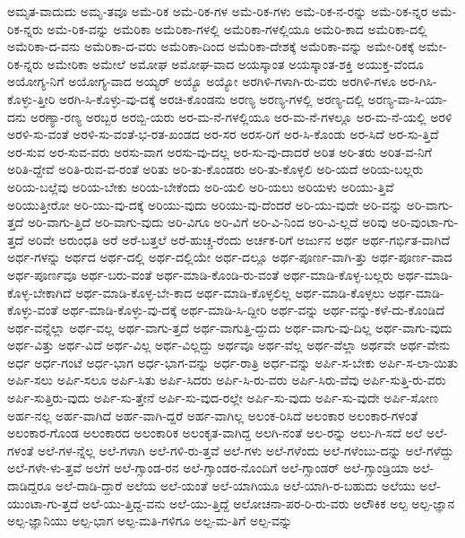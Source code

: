 {ಅಮೃತ-ವಾದುದು
ಅಮೃ-ತವೂ
ಅಮೆ-ರಿಕ
ಅಮೆ-ರಿಕ-ಗಳ
ಅಮೆ-ರಿಕ-ಗಳು
ಅಮೆ-ರಿಕ-ನ-ರನ್ನು
ಅಮೆ-ರಿಕ-ನ್ನರ
ಅಮೆ-ರಿಕ-ನ್ನರು
ಅಮೆ-ರಿಕ-ವನ್ನು
ಅಮೆರಿಕಾ
ಅಮೆರಿಕಾ-ಗಳಲ್ಲಿ
ಅಮೆರಿಕಾ-ಗಳಲ್ಲಿಯೂ
ಅಮೆರಿ-ಕಾದ
ಅಮೆರಿಕಾ-ದಲ್ಲಿ
ಅಮೆರಿಕಾ-ದ-ವನು
ಅಮೆರಿಕಾ-ದ-ವರು
ಅಮೆರಿಕಾ-ದಿಂದ
ಅಮೆರಿಕಾ-ದೇಶಕ್ಕೆ
ಅಮೆರಿಕಾ-ವನ್ನು
ಅಮೇ-ರಿಕಕ್ಕೆ
ಅಮೇ-ರಿಕ-ನ್ನರು
ಅಮೇರಿಕಾ
ಅಮೇಲೆ
ಅಮೋಘ
ಅಮೋಘ-ವಾದ
ಅಯಸ್ಕಾಂತ
ಅಯಸ್ಕಾಂತ-ಶಕ್ತಿ
ಅಯುಕ್ತ-ವೆಂದೂ
ಅಯೋಗ್ಯ-ನಿಗೆ
ಅಯೋಗ್ಯ-ವಾದ
ಅಯ್ಯರ್
ಅಯ್ಯೊ
ಅಯ್ಯೋ
ಅರಗಿಳಿ-ಗಳಾಗಿ-ರು-ವರು
ಅರಗಿಳಿ-ಗಳೂ
ಅರ-ಗಿಸಿ-ಕೊಳ್ಳು-ತ್ತೀರಿ
ಅರಗಿ-ಸಿ-ಕೊಳ್ಳು-ವು-ದಕ್ಕೆ
ಅರಚಿ-ಕೊಂಡನು
ಅರಣ್ಯ
ಅರಣ್ಯ-ಗಳಲ್ಲಿ
ಅರಣ್ಯ-ದಲ್ಲಿ
ಅರಣ್ಯ-ವಾ-ಸಿ-ಯಾ-ದನು
ಅರಣ್ಯಾ-ರಣ್ಯ
ಅರಬ್ಬರ
ಅರಬ್ಬಿ-ಯರು
ಅರ-ಮ-ನೆ-ಗಳಲ್ಲಿಯೂ
ಅರ-ಮ-ನೆ-ಗಳಲ್ಲೂ
ಅರ-ಮ-ನೆ-ಯಲ್ಲಿ
ಅರಳಿ
ಅರಳಿ-ಸು-ವಂತೆ
ಅರಳಿ-ಸು-ವಂತೆ-ಭ-ರತ-ಖಂಡದ
ಅರ-ಸರ
ಅರಸ-ರಿಗೆ
ಅರ-ಸಿ-ಕೊಂಡು
ಅರ-ಸಿದೆ
ಅರ-ಸು-ತ್ತಿದೆ
ಅರ-ಸುವ
ಅರ-ಸುವ-ವರು
ಅರಸು-ವಾಗ
ಅರಸು-ವು-ದಲ್ಲ
ಅರ-ಸು-ವು-ದಾದರೆ
ಅರಿತ
ಅರಿ-ತರು
ಅರಿತ-ವ-ನಿಗೆ
ಅರಿತಿ-ದ್ದೇವೆ
ಅರಿತಿ-ರುವ-ವ-ರಂತೆ
ಅರಿತು
ಅರಿ-ತು-ಕೊಂಡರು
ಅರಿ-ತು-ಕೊಳ್ಳಲಿ
ಅರಿ-ಯದೆ
ಅರಿಯ-ಬಲ್ಲರು
ಅರಿಯ-ಬಲ್ಲೆವು
ಅರಿಯ-ಬೇಕು
ಅರಿಯ-ಬೇಕೆಂದು
ಅರಿ-ಯಲಿ
ಅರಿ-ಯಲು
ಅರಿಯಳು
ಅರಿಯು-ತ್ತಿವೆ
ಅರಿಯುತ್ತೀರೋ
ಅರಿ-ಯು-ವು-ದಕ್ಕೆ
ಅರಿಯು-ವುದು
ಅರಿಯು-ವು-ದೆಂದರೆ
ಅರಿ-ಯು-ವುದೇ
ಅರಿ-ವನ್ನು
ಅರಿ-ವಾಗು-ತ್ತದೆ
ಅರಿ-ವಾಗು-ತ್ತಿದೆ
ಅರಿ-ವಾಗು-ವುದು
ಅರಿ-ವಿಗೂ
ಅರಿ-ವಿಗೆ
ಅರಿ-ವಿ-ನಿಂದ
ಅರಿ-ವಿ-ಲ್ಲದೆ
ಅರಿವು
ಅರಿ-ವುಂಟಾ-ಗು-ತ್ತದೆ
ಅರಿವೇ
ಅರುಂಧತಿ
ಅರೆ
ಅರೆ-ಬತ್ತಲೆ
ಅರೆ-ಹುಚ್ಚ-ರೆಂದು
ಅರ್ಚಕ-ರಿಗೆ
ಅರ್ಜುನ
ಅರ್ಥ
ಅರ್ಥ-ಗರ್ಭಿತ-ವಾಗಿದೆ
ಅರ್ಥ-ಗಳನ್ನು
ಅರ್ಥದ
ಅರ್ಥ-ದಲ್ಲಿ
ಅರ್ಥ-ದಲ್ಲಿಯೇ
ಅರ್ಥ-ದಲ್ಲೂ
ಅರ್ಥ-ಪೂರ್ಣ-ವಾಗಿ-ತ್ತು
ಅರ್ಥ-ಪೂರ್ಣ-ವಾದ
ಅರ್ಥ-ಪೂರ್ಣವೂ
ಅರ್ಥ-ಬರು-ವಂತೆ
ಅರ್ಥ-ಮಾಡಿ-ಕೊಂಡಿ-ರು-ವಂತೆ
ಅರ್ಥ-ಮಾಡಿ-ಕೊಳ್ಳ-ಬಲ್ಲರು
ಅರ್ಥ-ಮಾಡಿ-ಕೊಳ್ಳ-ಬೇಕಾಗಿದೆ
ಅರ್ಥ-ಮಾಡಿ-ಕೊಳ್ಳ-ಬೇ-ಕಾದ
ಅರ್ಥ-ಮಾಡಿ-ಕೊಳ್ಳಲಿಲ್ಲ
ಅರ್ಥ-ಮಾಡಿ-ಕೊಳ್ಳಲು
ಅರ್ಥ-ಮಾಡಿ-ಕೊಳ್ಳು-ವಂತೆ
ಅರ್ಥ-ಮಾಡಿ-ಕೊಳ್ಳು-ವು-ದಕ್ಕೆ
ಅರ್ಥ-ಮಾಡಿ-ಸಿ-ದ್ದೀರಿ
ಅರ್ಥ-ವನ್ನು
ಅರ್ಥ-ವನ್ನು-ಕಳೆ-ದು-ಕೊಂಡಿದೆ
ಅರ್ಥ-ವನ್ನೆಲ್ಲಾ
ಅರ್ಥ-ವಲ್ಲ
ಅರ್ಥ-ವಾಗು-ತ್ತದೆ
ಅರ್ಥ-ವಾಗುತ್ತಿ-ದ್ದುದು
ಅರ್ಥ-ವಾಗು-ವು-ದಿಲ್ಲ
ಅರ್ಥ-ವಾಗು-ವುದು
ಅರ್ಥ-ವಿತ್ತು
ಅರ್ಥ-ವಿದೆ
ಅರ್ಥ-ವಿಲ್ಲ
ಅರ್ಥ-ವಿಲ್ಲದ್ದು
ಅರ್ಥವೂ
ಅರ್ಥ-ವೆಲ್ಲ
ಅರ್ಥ-ವೆಲ್ಲಾ
ಅರ್ಥವೇ
ಅರ್ಥ-ವೇನು
ಅರ್ಧ
ಅರ್ಧ-ಗಂಟೆ
ಅರ್ಧ-ಭಾಗ
ಅರ್ಧ-ಭಾಗ-ವನ್ನು
ಅರ್ಧ-ರಾತ್ರಿ
ಅರ್ಧ-ವನ್ನು
ಅರ್ಪಿ-ಸ-ಬೇಕು
ಅರ್ಪಿ-ಸ-ಲಾ-ಯಿತು
ಅರ್ಪಿ-ಸಲು
ಅರ್ಪಿ-ಸಲೂ
ಅರ್ಪಿ-ಸಿತು
ಅರ್ಪಿ-ಸಿದರು
ಅರ್ಪಿ-ಸಿ-ರು-ವರು
ಅರ್ಪಿ-ಸಿರು-ವೆವು
ಅರ್ಪಿ-ಸುತ್ತಿ-ರು-ವರು
ಅರ್ಪಿ-ಸುತ್ತಿರು-ವುದು
ಅರ್ಪಿ-ಸು-ತ್ತೇನೆ
ಅರ್ಪಿ-ಸು-ವುದ-ರಲ್ಲೇ
ಅರ್ಪಿ-ಸು-ವುದು
ಅರ್ಪಿ-ಸು-ವುದೇ
ಅರ್ಪಿ-ಸೋಣ
ಅರ್ಹ-ನಲ್ಲ
ಅರ್ಹ-ವಾಗಿದೆ
ಅರ್ಹ-ವಾಗಿ-ದ್ದರೆ
ಅರ್ಹ-ವಾಗಿಲ್ಲ
ಅಲಂಕ-ರಿಸಿದೆ
ಅಲಂಕಾರ
ಅಲಂಕಾರ-ಗಳಂತೆ
ಅಲಂಕಾರ-ಗೊಂಡ
ಅಲಂಕಾರದ
ಅಲಂಕಾರಿಕ
ಅಲಂಕೃತ-ವಾಗಿದ್ದ
ಅಲಗಿ-ನಂತೆ
ಅಲ-ರನ್ನು
ಅಲು-ಗಿ-ಸದೆ
ಅಲೆ
ಅಲೆ-ಗಳಂತೆ
ಅಲೆ-ಗಳ-ನ್ನೆಲ್ಲ
ಅಲೆ-ಗಳಾಗಿ
ಅಲೆ-ಗಳಿ-ರು-ತ್ತವೆ
ಅಲೆ-ಗಳು
ಅಲೆ-ಗಳೆಂದು
ಅಲೆ-ಗಳೆಂಬು-ದನ್ನು
ಅಲೆ-ಗಳೆದ್ದು
ಅಲೆ-ಗಳೇ-ಳು-ತ್ತವೆ
ಅಲೆಗೆ
ಅಲೆ-ಗ್ಸಾಂಡ-ರನ
ಅಲೆ-ಗ್ಸಾಂಡರ-ನೊಂದಿಗೆ
ಅಲೆ-ಗ್ಸಾಂಡರ್
ಅಲೆ-ಗ್ಸಾಂಡ್ರಿಯಾ
ಅಲೆ-ದಾಡಿದ್ದರೂ
ಅಲೆ-ದಾಡಿ-ದ್ದಾರೆ
ಅಲೆಯ
ಅಲೆ-ಯಂತೆ
ಅಲೆ-ಯಾಗಿಯೂ
ಅಲೆ-ಯಾಗಿ-ರ-ಬಹುದು
ಅಲೆಯು
ಅಲೆ-ಯುಂಟಾ-ಗು-ತ್ತದೆ
ಅಲೆ-ಯು-ತ್ತಿದ್ದ-ವನು
ಅಲೆ-ಯು-ತ್ತಿದ್ದೆ
ಅಲೋಚನಾ-ಪರ-ರಿ-ರು-ವರು
ಅಲೌಕಿಕ
ಅಲ್ಪ
ಅಲ್ಪ-ಜ್ಞಾನ
ಅಲ್ಪ-ಜ್ಞಾನಿಯು
ಅಲ್ಪ-ಭಾಗ
ಅಲ್ಪ-ಮತಿ-ಗಳಿಗೂ
ಅಲ್ಪ-ಮ-ತಿಗೆ
ಅಲ್ಪ-ವನ್ನು
}
